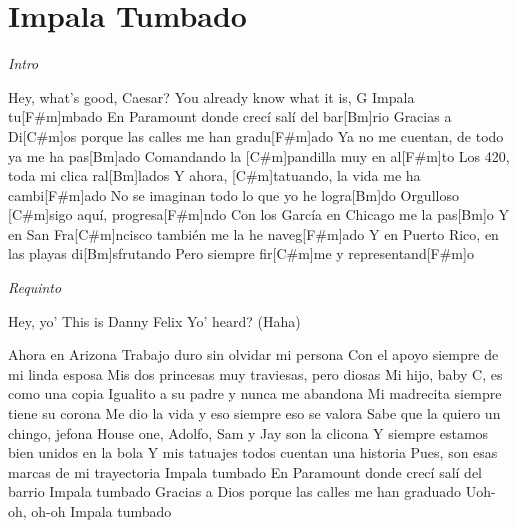 \section{Impala Tumbado}
\noindent

\vspace{1cm}

\begin{guitar}
	\begin{multicols}{2}
		\textit{Intro}
		\par

		Hey, what's good, Caesar?
		You already know what it is, G
		Impala tu[F#m]mbado
		En Paramount donde crecí salí del bar[Bm]rio
		Gracias a Di[C#m]os porque las calles me han gradu[F#m]ado
		Ya no me cuentan, de todo ya me ha pas[Bm]ado
		Comandando la [C#m]pandilla muy en al[F#m]to
		Los 420, toda mi clica ral[Bm]lados
		Y ahora, [C#m]tatuando, la vida me ha cambi[F#m]ado
		No se imaginan todo lo que yo he logra[Bm]do
		Orgulloso [C#m]sigo aquí, progresa[F#m]ndo
		Con los García en Chicago me la pas[Bm]o
		Y en San Fra[C#m]ncisco también me la he naveg[F#m]ado
		Y en Puerto Rico, en las playas di[Bm]sfrutando
		Pero siempre fir[C#m]me y representand[F#m]o
		\par
		\textit{Requinto}
		\par
		Hey, yo'
		This is Danny Felix
		Yo' heard? (Haha)
		\par
		Ahora en Arizona
		Trabajo duro sin olvidar mi persona
		Con el apoyo siempre de mi linda esposa
		Mis dos princesas muy traviesas, pero diosas
		Mi hijo, baby C, es como una copia
		Igualito a su padre y nunca me abandona
		Mi madrecita siempre tiene su corona
		Me dio la vida y eso siempre eso se valora
		Sabe que la quiero un chingo, jefona
		House one, Adolfo, Sam y Jay son la clicona
		Y siempre estamos bien unidos en la bola
		Y mis tatuajes todos cuentan una historia
		Pues, son esas marcas de mi trayectoria
		Impala tumbado
		En Paramount donde crecí salí del barrio
		Impala tumbado
		Gracias a Dios porque las calles me han graduado
		Uoh-oh, oh-oh
		Impala tumbado

	\end{multicols}
\end{guitar}

